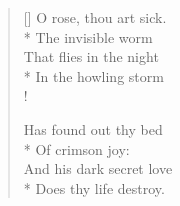 \documentclass[MAIN]{subfiles}
\begin{document}
\settowidth{\versewidth}{\vin In the invisible storm}
\begin{verse}[\versewidth]
O rose, thou art sick.\\*
\vin The invisible worm\\
That flies in the night\\*
\vin In the howling storm\\!

Has found out thy bed\\*
\vin Of crimson joy:\\
And his dark secret love\\*
\vin Does thy life destroy.
\end{verse}
\end{document}
